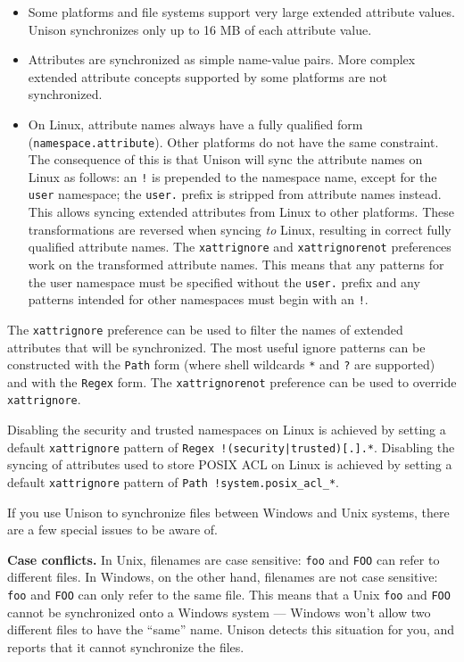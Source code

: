 \documentclass{article}
\begin{document}
\begin{itemize}
\item Some platforms and file systems support very large extended attribute
values. Unison synchronizes only up to 16 MB of each attribute value.
\item Attributes are synchronized as simple name-value pairs. More complex
extended attribute concepts supported by some platforms are not synchronized.
\item On Linux, attribute names always have a fully qualified form
(\texttt{namespace.attribute}). Other platforms do not have the same constraint.
The consequence of this is that Unison will sync the attribute names on Linux
as follows: an \verb|!| is prepended to the namespace name, except for the
\verb|user| namespace; the \verb|user.| prefix is stripped from attribute names
instead. This allows syncing extended attributes from Linux to other platforms.
These transformations are reversed when syncing {\em to} Linux, resulting in
correct fully qualified attribute names.
The \verb|xattrignore| and \verb|xattrignorenot| preferences work on the
transformed attribute names. This means that any patterns for the user
namespace must be specified without the \verb|user.| prefix and any patterns
intended for other namespaces must begin with an \verb|!|.
\end{itemize}

The \verb|xattrignore| preference can be used to filter the names of extended
attributes that will be synchronized. The most useful ignore patterns can
be constructed with the \verb|Path| form (where shell wildcards \verb|*| and
\verb|?| are supported) and with the \verb|Regex| form. The
\verb|xattrignorenot| preference can be used to override \verb|xattrignore|.

Disabling the security and trusted namespaces on Linux is achieved by setting
a default \verb|xattrignore| pattern of
\texttt{Regex !(security|trusted)[.].*}.
Disabling the syncing of attributes used to store POSIX ACL on Linux is
achieved by setting a default \verb|xattrignore| pattern of
\texttt{Path !system.posix\_acl\_*}.



If you use Unison to synchronize files between Windows and Unix
systems, there are a few special issues to be aware of.

\textbf{Case conflicts.}  In Unix, filenames are case sensitive:
\texttt{foo} and \texttt{FOO} can refer to different files.  In
Windows, on the other hand, filenames are not case sensitive:
\texttt{foo} and \texttt{FOO} can only refer to the same file.  This
means that a Unix \texttt{foo} and \texttt{FOO} cannot be synchronized
onto a Windows system --- Windows won't allow two different files to
have the ``same'' name.  Unison detects this situation for you, and
reports that it cannot synchronize the files.
\end{document}
